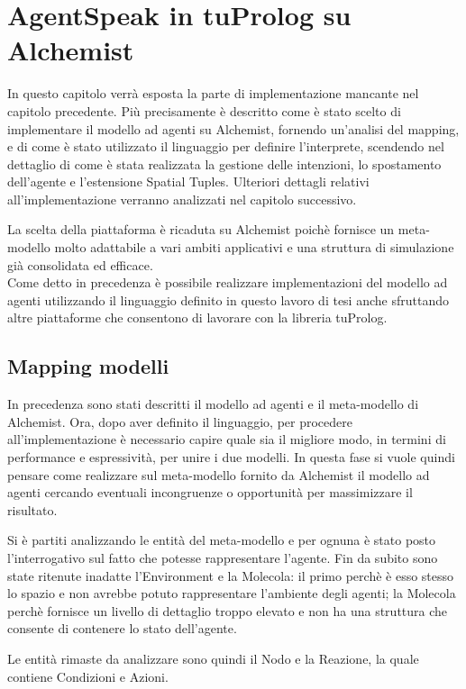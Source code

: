 \chapter{AgentSpeak in tuProlog su Alchemist}
In questo capitolo verrà esposta la parte di implementazione mancante nel capitolo precedente. Più precisamente è descritto come è stato scelto di implementare il modello ad agenti su Alchemist, fornendo un'analisi del mapping, e di come è stato utilizzato il linguaggio per definire l'interprete, scendendo nel dettaglio di come è stata realizzata la gestione delle intenzioni, lo spostamento dell'agente e l'estensione Spatial Tuples. Ulteriori dettagli relativi all'implementazione verranno analizzati nel capitolo successivo.

La scelta della piattaforma è ricaduta su Alchemist poichè fornisce un meta-modello molto adattabile a vari ambiti applicativi e una struttura di simulazione già consolidata ed efficace.
\\
Come detto in precedenza è possibile realizzare implementazioni del modello ad agenti utilizzando il linguaggio definito in questo lavoro di tesi anche sfruttando altre piattaforme che consentono di lavorare con la libreria tuProlog.

\section{Mapping modelli}\label{sctn:mapping}
In precedenza sono stati descritti il modello ad agenti e il meta-modello di Alchemist. Ora, dopo aver definito il linguaggio, per procedere all'implementazione è necessario capire quale sia il migliore modo, in termini di performance e espressività, per unire i due modelli.
In questa fase si vuole quindi pensare come realizzare sul meta-modello fornito da Alchemist il modello ad agenti cercando eventuali incongruenze o opportunità per massimizzare il risultato.

Si è partiti analizzando le entità del meta-modello e per ognuna è stato posto l'interrogativo sul fatto che potesse rappresentare l'agente.
Fin da subito sono state ritenute inadatte l'Environment e la Molecola: il primo perchè è esso stesso lo spazio e non avrebbe potuto rappresentare l'ambiente degli agenti; la Molecola perchè fornisce un livello di dettaglio troppo elevato e non ha una struttura che consente di contenere lo stato dell'agente.

Le entità rimaste da analizzare sono quindi il Nodo e la Reazione, la quale contiene Condizioni e Azioni.

